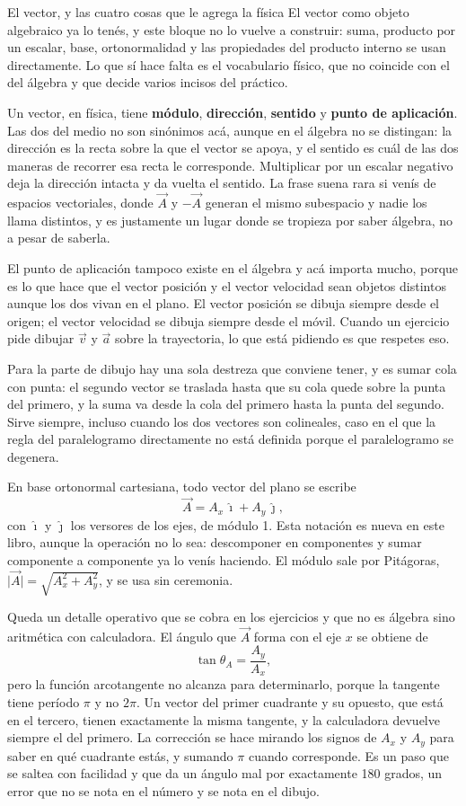 \documentclass[11pt,openany]{book}
\begin{document}
\begin{bloque}{El vector, y las cuatro cosas que le agrega la física}
El vector como objeto algebraico ya lo tenés, y este bloque no lo vuelve a construir: suma, producto por un escalar, base, ortonormalidad y las propiedades del producto interno se usan directamente. Lo que sí hace falta es el vocabulario físico, que no coincide con el del álgebra y que decide varios incisos del práctico.

Un vector, en física, tiene \textbf{módulo}, \textbf{dirección}, \textbf{sentido} y \textbf{punto de aplicación}. Las dos del medio no son sinónimos acá, aunque en el álgebra no se distingan: la dirección es la recta sobre la que el vector se apoya, y el sentido es cuál de las dos maneras de recorrer esa recta le corresponde. Multiplicar por un escalar negativo deja la dirección intacta y da vuelta el sentido. La frase suena rara si venís de espacios vectoriales, donde $\vec A$ y $-\vec A$ generan el mismo subespacio y nadie los llama distintos, y es justamente un lugar donde se tropieza por saber álgebra, no a pesar de saberla.

El punto de aplicación tampoco existe en el álgebra y acá importa mucho, porque es lo que hace que el vector posición y el vector velocidad sean objetos distintos aunque los dos vivan en el plano. El vector posición se dibuja siempre desde el origen; el vector velocidad se dibuja siempre desde el móvil. Cuando un ejercicio pide dibujar $\vec v$ y $\vec a$ sobre la trayectoria, lo que está pidiendo es que respetes eso.

Para la parte de dibujo hay una sola destreza que conviene tener, y es sumar cola con punta: el segundo vector se traslada hasta que su cola quede sobre la punta del primero, y la suma va desde la cola del primero hasta la punta del segundo. Sirve siempre, incluso cuando los dos vectores son colineales, caso en el que la regla del paralelogramo directamente no está definida porque el paralelogramo se degenera.

En base ortonormal cartesiana, todo vector del plano se escribe
\[
\vec A = A_x\,\hat\imath + A_y\,\hat\jmath,
\]
con $\hat\imath$ y $\hat\jmath$ los versores de los ejes, de módulo 1. Esta notación es nueva en este libro, aunque la operación no lo sea: descomponer en componentes y sumar componente a componente ya lo venís haciendo. El módulo sale por Pitágoras, $\lvert\vec A\rvert = \sqrt{A_x^2+A_y^2}$, y se usa sin ceremonia.

Queda un detalle operativo que se cobra en los ejercicios y que no es álgebra sino aritmética con calculadora. El ángulo que $\vec A$ forma con el eje $x$ se obtiene de
\[
\tan\theta_A = \frac{A_y}{A_x},
\]
pero la función arcotangente no alcanza para determinarlo, porque la tangente tiene período $\pi$ y no $2\pi$. Un vector del primer cuadrante y su opuesto, que está en el tercero, tienen exactamente la misma tangente, y la calculadora devuelve siempre el del primero. La corrección se hace mirando los signos de $A_x$ y $A_y$ para saber en qué cuadrante estás, y sumando $\pi$ cuando corresponde. Es un paso que se saltea con facilidad y que da un ángulo mal por exactamente 180 grados, un error que no se nota en el número y se nota en el dibujo.


\end{bloque}
\end{document}
